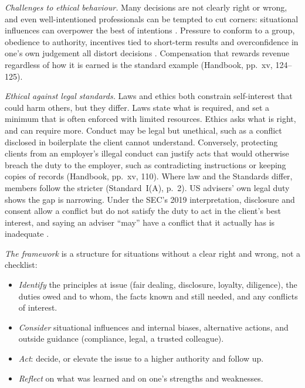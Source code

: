 \begin{qfmethod}\label{meth:ethical-decision-framework}
 \emph{Challenges to ethical behaviour.} Many decisions are not clearly right or wrong, and even well-intentioned professionals can be tempted to cut corners: situational influences can overpower the best of intentions \citep[p.~xvii]{standards-practice-handbook-2024}. Pressure to conform to a group, obedience to authority, incentives tied to short-term results and overconfidence in one's own judgement all distort decisions \citep[p.~1]{ethical-decision-framework-2014}. Compensation that rewards revenue regardless of how it is earned is the standard example (Handbook, pp.~xv, 124--125).

\emph{Ethical against legal standards.} Laws and ethics both constrain self-interest that could harm others, but they differ. Laws state what is required, and set a minimum that is often enforced with limited resources. Ethics asks what is right, and can require more. Conduct may be legal but unethical, such as a conflict disclosed in boilerplate the client cannot understand. Conversely, protecting clients from an employer's illegal conduct can justify acts that would otherwise breach the duty to the employer, such as contradicting instructions or keeping copies of records (Handbook, pp.~xv, 110). Where law and the Standards differ, members follow the stricter (Standard~I(A), p.~2). US advisers' own legal duty shows the gap is narrowing. Under the SEC's 2019 interpretation, disclosure and consent allow a conflict but do not satisfy the duty to act in the client's best interest, and saying an adviser ``may'' have a conflict that it actually has is inadequate \citep[84 FR 33669, at 33672, 33676]{sec-adviser-standard-of-conduct-2019}.

\emph{The framework} \citep[p.~1]{ethical-decision-framework-2014} is a structure for situations without a clear right and wrong, not a checklist:
\begin{itemize}
\item \emph{Identify} the principles at issue (fair dealing, disclosure, loyalty, diligence), the duties owed and to whom, the facts known and still needed, and any conflicts of interest.
\item \emph{Consider} situational influences and internal biases, alternative actions, and outside guidance (compliance, legal, a trusted colleague).
\item \emph{Act}: decide, or elevate the issue to a higher authority and follow up.
\item \emph{Reflect} on what was learned and on one's strengths and weaknesses.
\end{itemize}


\end{qfmethod}
